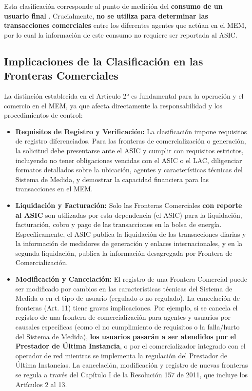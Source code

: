 \documentclass[a5paper]{book}%
\begin{document}
Esta clasificación corresponde al punto de medición del \textbf{consumo de un usuario final} . Crucialmente, \textbf{no se utiliza para determinar las transacciones comerciales} entre los diferentes agentes que actúan en el MEM, por lo cual la información de este consumo no requiere ser reportada al ASIC.

\subsection{Implicaciones de la Clasificación en las Fronteras Comerciales}

La distinción establecida en el Artículo 2° es fundamental para la operación y el comercio en el MEM, ya que afecta directamente la responsabilidad y los procedimientos de control:

\begin{itemize}
	\item \textbf{Requisitos de Registro y Verificación:} La clasificación impone requisitos de registro diferenciados. Para las fronteras de comercialización o generación, la solicitud debe presentarse ante el ASIC y cumplir con requisitos estrictos, incluyendo no tener obligaciones vencidas con el ASIC o el LAC, diligenciar formatos detallados sobre la ubicación, agentes y características técnicas del Sistema de Medida, y demostrar la capacidad financiera para las transacciones en el MEM.
	\item \textbf{Liquidación y Facturación:} Solo las Fronteras Comerciales \textbf{con reporte al ASIC} son utilizadas por esta dependencia (el ASIC) para la liquidación, facturación, cobro y pago de las transacciones en la bolsa de energía. Específicamente, el ASIC publica la liquidación de las transacciones diarias y la información de medidores de generación y enlaces internacionales, y en la segunda liquidación, publica la información desagregada por Frontera de Comercialización.
	\item \textbf{Modificación y Cancelación:} El registro de una Frontera Comercial puede ser modificado por cambios en las características técnicas del Sistema de Medida o en el tipo de usuario (regulado o no regulado). La cancelación de fronteras (Art. 11) tiene graves implicaciones. Por ejemplo, si se cancela el registro de una frontera de comercialización para agentes y usuarios por causales específicas (como el no cumplimiento de requisitos o la falla/hurto del Sistema de Medida), \textbf{los usuarios pasarán a ser atendidos por el Prestador de Última Instancia}, o por el comercializador integrado con el operador de red mientras se implementa la regulación del Prestador de Última Instancias. La cancelación, modificación y registro de nuevas fronteras se regula a través del Capítulo I de la Resolución 157 de 2011, que incluye los Artículos 2 al 13.
\end{itemize}
\end{document}
